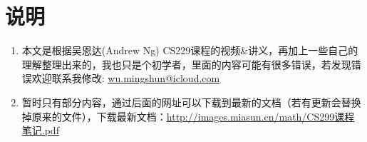 \section*{说明}
\begin{enumerate}
	\item 本文是根据吴恩达(Andrew Ng) CS229课程的视频\&讲义，再加上一些自己的理解整理出来的，我也只是个初学者，里面的内容可能有很多错误，若发现错误欢迎联系我修改: \href{mailto:wu.mingshun@icloud.com}{wu.mingshun@icloud.com}
	\item 暂时只有部分内容，通过后面的网址可以下载到最新的文档（若有更新会替换掉原来的文件），下载最新文档：\href{http://images.miasun.cn/math/CS299课程笔记.pdf}{http://images.miasun.cn/math/CS299课程笔记.pdf}
	
\end{enumerate}



























